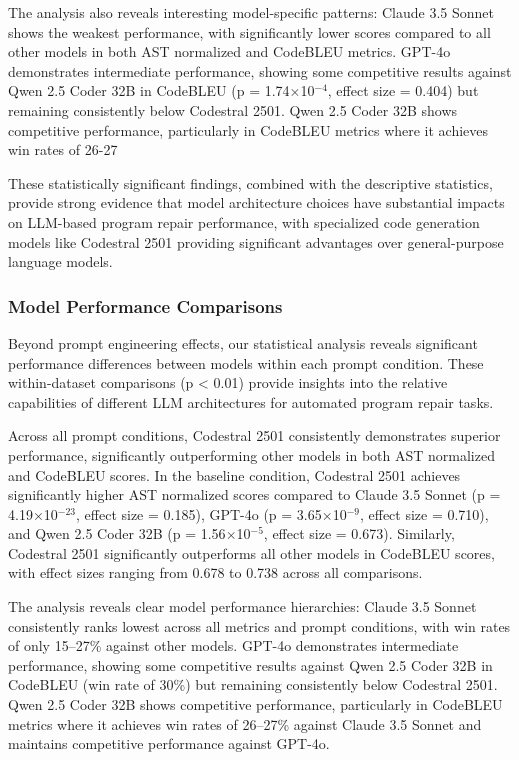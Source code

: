 The analysis also reveals interesting model-specific patterns: Claude 3.5 Sonnet shows the weakest performance, with significantly lower scores compared to all other models in both AST normalized and CodeBLEU metrics. GPT-4o demonstrates intermediate performance, showing some competitive results against Qwen 2.5 Coder 32B in CodeBLEU (p = 1.74$\times$10$^{-4}$, effect size = 0.404) but remaining consistently below Codestral 2501. Qwen 2.5 Coder 32B shows competitive performance, particularly in CodeBLEU metrics where it achieves win rates of 26-27%

These statistically significant findings, combined with the descriptive statistics, provide strong evidence that model architecture choices have substantial impacts on LLM-based program repair performance, with specialized code generation models like Codestral 2501 providing significant advantages over general-purpose language models.

\subsubsection{Model Performance Comparisons}
Beyond prompt engineering effects, our statistical analysis reveals significant performance differences between models within each prompt condition. These within-dataset comparisons (p < 0.01) provide insights into the relative capabilities of different LLM architectures for automated program repair tasks.

Across all prompt conditions, Codestral 2501 consistently demonstrates superior performance, significantly outperforming other models in both AST normalized and CodeBLEU scores. In the baseline condition, Codestral 2501 achieves significantly higher AST normalized scores compared to Claude 3.5 Sonnet (p = 4.19$\times$10$^{-23}$, effect size = 0.185), GPT-4o (p = 3.65$\times$10$^{-9}$, effect size = 0.710), and Qwen 2.5 Coder 32B (p = 1.56$\times$10$^{-5}$, effect size = 0.673). Similarly, Codestral 2501 significantly outperforms all other models in CodeBLEU scores, with effect sizes ranging from 0.678 to 0.738 across all comparisons.

The analysis reveals clear model performance hierarchies: Claude 3.5 Sonnet consistently ranks lowest across all metrics and prompt conditions, with win rates of only 15--27\% against other models. GPT-4o demonstrates intermediate performance, showing some competitive results against Qwen 2.5 Coder 32B in CodeBLEU (win rate of 30\%) but remaining consistently below Codestral 2501. Qwen 2.5 Coder 32B shows competitive performance, particularly in CodeBLEU metrics where it achieves win rates of 26--27\% against Claude 3.5 Sonnet and maintains competitive performance against GPT-4o.

